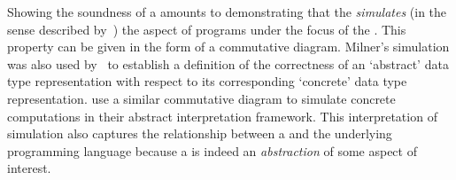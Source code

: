 
Showing the soundness of a \nm{}
amounts to demonstrating that
the \nm{} \emph{simulates}
(in the sense described by~\citet{milnerAlgebraicDefinitionSimulation1971})
the aspect of programs under the focus of the \nm{}.
%
This property can be given in the form of a commutative diagram.
%
Milner's simulation was also used
by~\citet{hoareProofCorrectnessData1972}
to establish a definition of
the correctness of
an `abstract' data type representation
with respect to
its corresponding `concrete' data type representation.
%
\citet{cousotAbstractInterpretationUnified1977} use a similar commutative diagram to simulate concrete computations in their abstract interpretation framework.
%
This interpretation of simulation
also captures the relationship between a \nm{} and the underlying programming language
because
a \nm{} is indeed an \emph{abstraction} of some aspect of interest.



